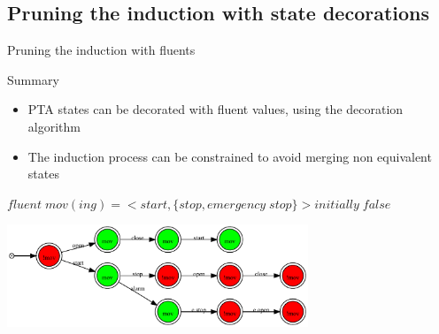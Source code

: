 \documentclass[11pt]{beamer}
\begin{document}
\subsection{Pruning the induction with state decorations}
\begin{frame}{Pruning the induction with fluents}
	\begin{block}{Summary}
		\begin{itemize}
			\item PTA states can be decorated with fluent values, using the decoration algorithm
			\item The induction process can be constrained to avoid merging non equivalent states
		\end{itemize}
	\end{block}
	\begin{center}
		$fluent\;mov(ing) = <start, \{stop, emergency\;stop\}> initially\;false$
	\end{center}
	\begin{center}
		\includegraphics[width=9cm]{images/train_pta.pdf}
	\end{center}
\end{frame}
\end{document}
